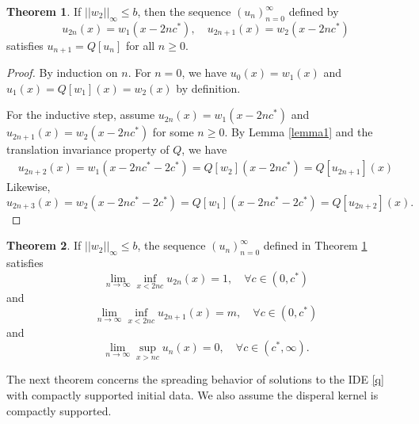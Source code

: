 \documentclass[11pt]{article}
\theoremstyle{definition}
\newtheorem{thm}{Theorem}
\numberwithin{equation}{section}
\numberwithin{thm}{section}
\begin{document}
\begin{thm} \label{theorem1}
If $||w_2||_\infty\leq b$, then the sequence $(u_n)_{n=0}^{\infty}$ defined by
\begin{equation} \label{ptw}
u_{2n}(x) = w_1(x-2nc^*), \quad 
u_{2n+1}(x) = w_2(x-2nc^*)
\end{equation}
satisfies $u_{n+1}=Q[u_n]$ for all $n\geq 0$.
\end{thm}

\begin{proof}
By induction on $n$. For $n=0$, we have $u_0(x)=w_1(x)$ and $u_1(x)=Q[w_1](x)=w_2(x)$ by definition.

For the inductive step, assume $u_{2n}(x) = w_1(x-2nc^*)$ and $u_{2n+1}(x) = w_2(x-2nc^*)$ for some $n\geq 0$. By Lemma \ref{lemma1} and the translation invariance property of $Q$, we have
\begin{equation} \begin{aligned}
u_{2n+2}(x) = w_1(x-2nc^*-2c^*) = Q[w_2](x-2nc^*) = Q[u_{2n+1}](x)
\end{aligned} \end{equation}
 Likewise,
\begin{equation}
u_{2n+3}(x) = w_2(x-2nc^*-2c^*) = Q[w_1](x-2nc^*-2c^*) = Q[u_{2n+2}](x).
\end{equation}
\end{proof}

\begin{thm}  \label{theorem2}
If $||w_2||_\infty\leq b$, the sequence $(u_n)_{n=0}^{\infty}$ defined in Theorem \ref{theorem1} satisfies
\begin{equation}
\lim_{n\to\infty}\inf_{x<2nc}u_{2n}(x)=1, \quad \forall c\in(0,c^*)
\end{equation}
and
\begin{equation}
\lim_{n\to\infty}\inf_{x<2nc}u_{2n+1}(x)=m, \quad \forall c\in(0,c^*)
\end{equation}
and 
\begin{equation}
\lim_{n\to\infty}\sup_{x>nc}u_n(x)=0, \quad \forall c\in(c^*,\infty).
\end{equation}
\end{thm}

The next theorem concerns the spreading behavior of solutions to the IDE \eqref{q} with compactly supported initial data. We also assume the disperal kernel is compactly supported.
\end{document}
